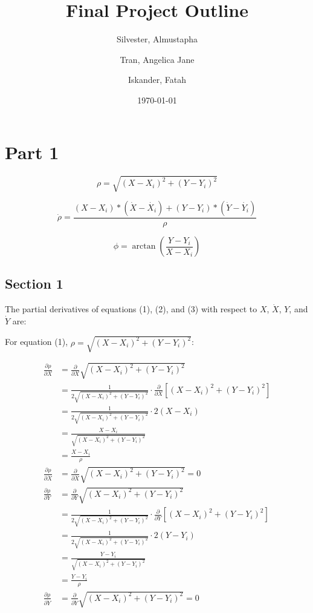 \documentclass{article}
\title{Final Project Outline}
\author{Silvester, Almustapha\\ 
\and
Tran, Angelica Jane
\and
Iskander, Fatah}
\date{\today}
\begin{document}
\maketitle

\section{Part 1}

\begin{equation}
    \rho = \sqrt{(X-X_i)^2 + (Y-Y_i)^2}
\end{equation}

\begin{equation}
    \dot{\rho} = \frac{(X-X_i)*(\dot{X}-\dot{X_i})+(Y-Y_i)*(\dot{Y}-\dot{Y_i})}{\rho}
\end{equation}

\begin{equation}
    \phi = \arctan(\frac{Y-Y_i}{X-X_i})
\end{equation}

\subsection{Section 1}

The partial derivatives of equations (1), (2), and (3) with respect to $X$, $\dot{X}$, $Y$, and $\dot{Y}$ are:

For equation (1), $\rho = \sqrt{(X-X_i)^2 + (Y-Y_i)^2}$:

\begin{align*}
    \frac{\partial \rho}{\partial X} &= \frac{\partial}{\partial X} \sqrt{(X-X_i)^2 + (Y-Y_i)^2} \\
    &= \frac{1}{2\sqrt{(X-X_i)^2 + (Y-Y_i)^2}} \cdot \frac{\partial}{\partial X}[(X-X_i)^2 + (Y-Y_i)^2] \\
    &= \frac{1}{2\sqrt{(X-X_i)^2 + (Y-Y_i)^2}} \cdot 2(X-X_i) \\
    &= \frac{X-X_i}{\sqrt{(X-X_i)^2 + (Y-Y_i)^2}} \\
    &= \frac{X-X_i}{\rho} \\[10pt]
    \frac{\partial \rho}{\partial \dot{X}} &= \frac{\partial}{\partial \dot{X}} \sqrt{(X-X_i)^2 + (Y-Y_i)^2} = 0 \\[10pt]
    \frac{\partial \rho}{\partial Y} &= \frac{\partial}{\partial Y} \sqrt{(X-X_i)^2 + (Y-Y_i)^2} \\
    &= \frac{1}{2\sqrt{(X-X_i)^2 + (Y-Y_i)^2}} \cdot \frac{\partial}{\partial Y}[(X-X_i)^2 + (Y-Y_i)^2] \\
    &= \frac{1}{2\sqrt{(X-X_i)^2 + (Y-Y_i)^2}} \cdot 2(Y-Y_i) \\
    &= \frac{Y-Y_i}{\sqrt{(X-X_i)^2 + (Y-Y_i)^2}} \\
    &= \frac{Y-Y_i}{\rho} \\[10pt]
    \frac{\partial \rho}{\partial \dot{Y}} &= \frac{\partial}{\partial \dot{Y}} \sqrt{(X-X_i)^2 + (Y-Y_i)^2} = 0
\end{align*}
\end{document}
